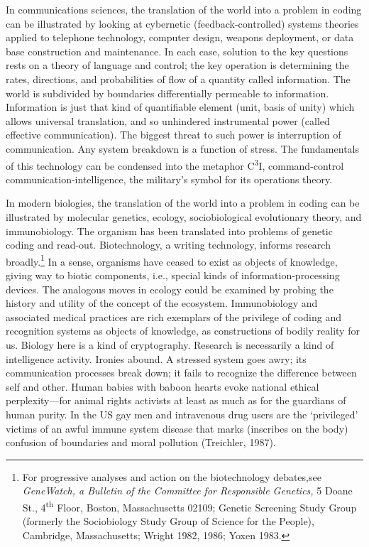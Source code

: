 \documentclass[DIV=12,%
               BCOR=10mm,%
               headinclude=false,%
               footinclude=false,open=any,%
               fontsize=11pt,%
               twoside,%
               paper=210mm:11in]%
               {scrbook}
\begin{document}
In communications sciences, the translation of the world into a problem in coding can be illustrated by looking at cybernetic (feedback-controlled) systems theories applied to telephone technology, computer design, weapons deployment, or data base construction and maintenance. In each case, solution to the key questions rests on a theory of language and control; the key operation is determining the rates, directions, and probabilities of flow of a quantity called information. The world is subdivided by boundaries differentially permeable to information. Information is just that kind of quantifiable element (unit, basis of unity) which allows universal translation, and so unhindered instrumental power (called effective communication). The biggest threat to such power is interruption of communication. Any system breakdown is a function of stress. The fundamentals of this technology can be condensed into the metaphor C\textsuperscript{3}I, command-control communication-intelligence, the military’s symbol for its operations theory.


In modern biologies, the translation of the world into a problem in coding can be illustrated by molecular genetics, ecology, sociobiological evolutionary theory, and immunobiology. The organism has been translated into problems of genetic coding and read-out. Biotechnology, a writing technology, informs research broadly.\footnote{For progressive analyses and action on the biotechnology debates,see \emph{GeneWatch, a Bulletin of the Committee for Responsible Genetics,} 5 Doane St., 4\textsuperscript{th} Floor, Boston, Massachusetts 02109; Genetic Screening Study Group (formerly the Sociobiology Study Group of Science for the People), Cambridge, Massachusetts; Wright 1982, 1986; Yoxen 1983.} In a sense, organisms have ceased to exist as objects of knowledge, giving way to biotic components, i.e., special kinds of information-processing devices. The analogous moves in ecology could be examined by probing the history and utility of the concept of the ecosystem. Immunobiology and associated medical practices are rich exemplars of the privilege of coding and recognition systems as objects of knowledge, as constructions of bodily reality for us. Biology here is a kind of cryptography. Research is necessarily a kind of intelligence activity. Ironies abound. A stressed system goes awry; its communication processes break down; it fails to recognize the difference between self and other. Human babies with baboon hearts evoke national ethical perplexity—for animal rights activists at least as much as for the guardians of human purity. In the US gay men and intravenous drug users are the ‘privileged’ victims of an awful immune system disease that marks (inscribes on the body) confusion of boundaries and moral pollution (Treichler, 1987).
\end{document}
